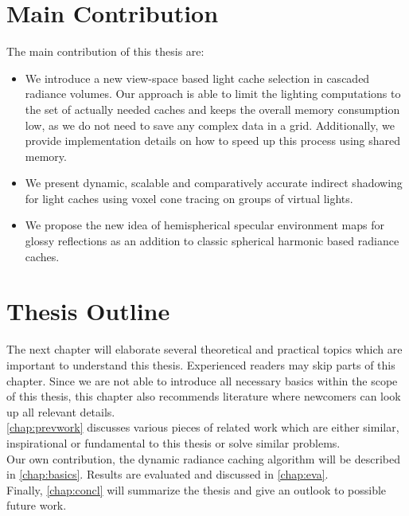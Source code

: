\documentclass[thesis.tex]{subfiles}
\begin{document}
\section{Main Contribution}
The main contribution of this thesis are:
\begin{itemize}
\item We introduce a new view-space based light cache selection in cascaded radiance volumes. Our approach is able to limit the lighting computations to the set of actually needed caches and keeps the overall memory consumption low, as we do not need to save any complex data in a grid. Additionally, we provide implementation details on how to speed up this process using shared memory.
\item We present dynamic, scalable and comparatively accurate indirect shadowing for light caches using voxel cone tracing on groups of virtual lights.
\item We propose the new idea of hemispherical specular environment maps for glossy reflections as an addition to classic spherical harmonic based radiance caches.
\end{itemize}

\section{Thesis Outline}
The next chapter will elaborate several theoretical and practical topics which are important to understand this thesis. %
Experienced readers may skip parts of this chapter.
Since we are not able to introduce all necessary basics within the scope of this thesis, this chapter also recommends literature where newcomers can look up all relevant details.
\\
\autoref{chap:prevwork} discusses various pieces of related work which are either similar, inspirational or fundamental to this thesis or solve similar problems.
\\
Our own contribution, the dynamic radiance caching algorithm will be described in \autoref{chap:basics}.
Results are evaluated and discussed in \autoref{chap:eva}.
\\
Finally, \autoref{chap:concl} will summarize the thesis and give an outlook to possible future work.

\subfilebib %
\end{document}
